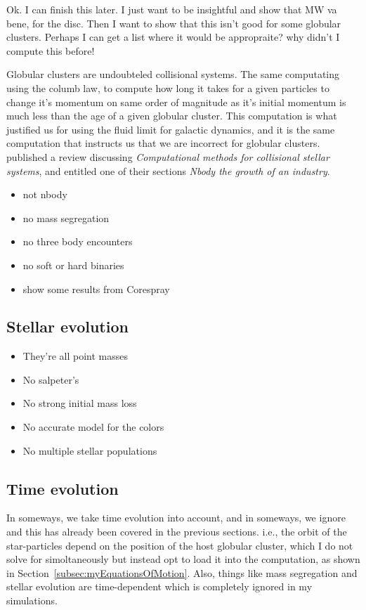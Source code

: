         Ok. I can finish this later. I just want to be insightful and show that MW va bene, for the disc. Then I want to show that this isn't good for some globular clusters. Perhaps I can get a list where it would be appropraite? why didn't I compute this before!

        
        
        

        
        
        

        Globular clusters are undoubteled collisional systems. The same computating using the columb law, to compute how long it takes for a given particles to change it's momentum on same order of magnitude as it's initial momentum is much less than the age of a given globular cluster. This computation is what justified us for using the fluid limit for galactic dynamics, and it is the same computation that instructs us that we are incorrect for globular clusters. \citet{2023LRCA....9....3S} published a review discussing \textit{Computational methods for collisional stellar systems}, and entitled one of their sections \textit{Nbody the growth of an industry}. 


        \begin{itemize}
            \item not nbody
            \item no mass segregation
            \item no three body encounters 
            \item no soft or hard binaries 
            \item show some results from Corespray 
        \end{itemize}
    
    \subsection{Stellar evolution}
        \begin{itemize}
            \item They're all point masses 
            \item No salpeter's 
            \item No strong initial mass loss 
            \item No accurate model for the colors 
            \item No multiple stellar populations 
        \end{itemize}
    
    \subsection{Time evolution}
        In someways, we take time evolution into account, and in someways, we ignore and this has already been covered in the previous sections. i.e., the orbit of the star-particles depend on the position of the host globular cluster, which I do not solve for simoltaneously but instead opt to load it into the computation, as shown in Section~\ref{subsec:myEquationsOfMotion}. Also, things like mass segregation and stellar evolution are time-dependent which is completely ignored in my simulations. 

